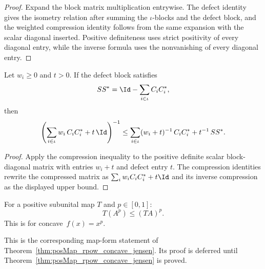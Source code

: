 \begin{proof}
    \leanok
    Expand the block matrix multiplication entrywise. The defect identity gives
    the isometry relation after summing the $\iota$-blocks and the defect block,
    and the weighted compression identity follows from the same expansion with
    the scalar diagonal inserted. Positive definiteness uses strict positivity
    of every diagonal entry, while the inverse formula uses the nonvanishing of
    every diagonal entry.
\end{proof}

\begin{lemma}\label{lem:operator_jensen_povm_resolvent}
    \leanok
    Let $w_i\ge 0$ and $t>0$. If the defect block satisfies
    \[
        S S^\ast = \Id - \sum_{i \in \iota} C_i C_i^\ast,
    \]
    then
    \[
        \left(\sum_{i \in \iota} w_i\, C_i C_i^\ast + t\,\Id\right)^{-1}
        \le
        \sum_{i \in \iota} (w_i+t)^{-1}\, C_i C_i^\ast + t^{-1}\, S S^\ast.
    \]
\end{lemma}

\begin{proof}
    \leanok
    Apply the compression inequality to the positive definite scalar
    block-diagonal matrix with entries $w_i+t$ and defect entry $t$.  The
    compression identities rewrite the compressed matrix as
    $\sum_i w_i C_i C_i^\ast + t\Id$ and its inverse compression as the displayed
    upper bound.
\end{proof}

\begin{theorem}\label{thm:posMap_rpow_concave_jensen}
    \notready
    For a positive subunital map $T$ and $p\in[0,1]$:
    \[
        T(A^p) \le (TA)^p.
    \]
    This is \cite[Theorem~5.1]{Wolf2012Quantum} for concave~$f(x)=x^p$.
\end{theorem}

\begin{theorem}\label{thm:rpow_concave_jensen}
    \notready
    This is the corresponding map-form statement of
    Theorem~\ref{thm:posMap_rpow_concave_jensen}.
    Its proof is deferred until
    Theorem~\ref{thm:posMap_rpow_concave_jensen} is proved.
\end{theorem}

